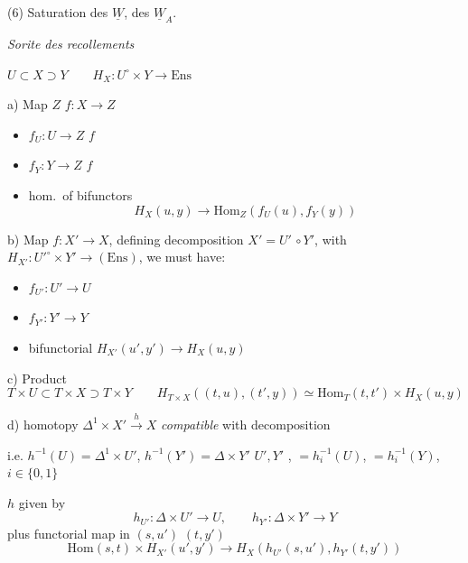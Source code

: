 \documentclass[11pt,a4paper]{article}
\begin{document}
(6) \struck{\ill{}} Saturation  des $\underline{W}$, des $\underline{W}_A$.

\emph{Sorite des recollements}

$U \subset X \supset Y \qquad H_X : U^{\circ} \times Y \to \mathrm{Ens}$

a) Map \struck{\ill{}} $Z$ \quad $f : X \to Z$
\begin{itemize}
  \item[(i)] $f_U : U \to Z$ \quad {} $f$
  \item[(ii)] $f_Y : Y \to Z$ \quad {} $f$
  \item[(iii)] hom.\ of bifunctors
    \[ H_X(u, y) \longrightarrow \mathrm{Hom}_Z(f_U(u), f_Y(y)) \]
\end{itemize}

b) Map $f : X' \to X$, defining decomposition $X' = U'$ \struck{\ill{}} $\circ\, Y'$, with $H_{X'} : U'^{\circ} \times Y' \to (\mathrm{Ens})$, we must have:
\begin{itemize}
  \item[(i)] $f_{U'} : U' \to U$
  \item[(ii)] $f_{Y'} : Y' \to Y$
  \item[(iii)] bifunctorial $H_{X'}(u', y') \to H_X(u, y)$
\end{itemize}

c) Product
\[
  T \times U \subset T \times X \supset T \times Y \qquad
  H_{T \times X}((t, u), (t', y)) \simeq \mathrm{Hom}_T(t, t') \times H_X(u, y)
\]

d) homotopy $\Delta^1 \times X' \xrightarrow{\ h\ } X$ \emph{compatible} with decomposition

i.e. $h^{-1}(U) = \Delta^1 \times U'$, $h^{-1}(Y') = \Delta \times Y'$ \quad $U', Y'$ \ill{}, $= h_i^{-1}(U)$, $= h_i^{-1}(Y)$, $i \in \{0, 1\}$

$h$ given by
\[
  h_{U'} : \Delta \times U' \to U, \qquad h_{Y'} : \Delta \times Y' \to Y
\]
plus  functorial map in $(s, u')$ $(t, y')$
\[
  \mathrm{Hom}(s, t) \times H_{X'}(u', y') \longrightarrow H_X(h_{U'}(s, u'), h_{Y'}(t, y'))
\]
\end{document}
